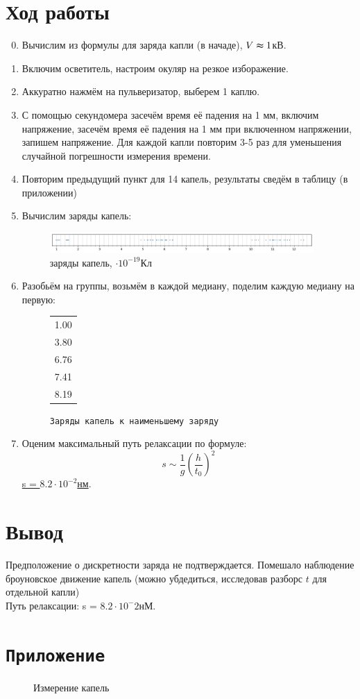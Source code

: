 \documentclass[12pt,a4paper]{article}
\begin{document}
\section{Ход работы}
\begin{enumerate}
  \setcounter{enumi}{-1}
  \item Вычислим из формулы для заряда капли (в начаде), $V\thickapprox 1$кВ.
  \item Включим осветитель, настроим окуляр на резкое изборажение.
  \item Аккуратно нажмём на пульверизатор, выберем 1 каплю.
  \item С помощью секундомера засечём время её падения на 1 мм, включим напряжение, засечём время её падения на 1 мм при включенном напряжении, запишем напряжение. Для каждой капли повторим 3-5 раз для уменьшения случайной погрешности измерения времени.
  \item Повторим предыдущий пункт для 14 капель, результаты сведём в таблицу (в приложении)
  \item Вычислим заряды капель:
  \begin{figure}[h!]
    \includegraphics*[width=0.95\textwidth]{17_14_01.png}
    \caption*{заряды капель, $\cdot 10^{-19}$Кл}
  \end{figure}
  \item Разобьём на группы, возьмём в каждой медиану, поделим каждую медиану на первую:
  \begin{figure}[h!]
    \begin{tabular}{r}
      1.00 \\
      3.80 \\
      6.76 \\
      7.41 \\
      8.19 \\
      \end{tabular}
      \caption*{\texttt{Заряды капель к наименьшему заряду}}
  \end{figure}
  \item Оценим максимальный путь релаксации по формуле:
  $$s \sim \frac{1}{g} \left( \frac{h}{t_0}\right)^2$$
  \underline{s = $8.2\cdot 10^{-2}$нм}.
\end{enumerate}


\section*{Вывод}
Предположение о дискретности заряда не подтверждается. Помешало наблюдение броуновское движение капель (можно убдедиться, исследовав разборс $t$ для отдельной капли)\\
Путь релаксации: s = $8.2\cdot 10^-2$нМ.

\newpage
\section*{\texttt{Приложение}}
\noindent
\begin{figure}[h!]
  
  
  \caption*{Измерение капель}
\end{figure}
\end{document}
